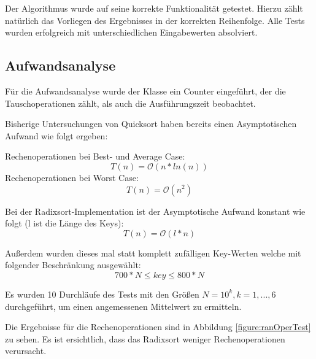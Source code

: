 \documentclass[11pt]{scrartcl}
\begin{document}
		Der Algorithmus wurde auf seine korrekte Funktionalität getestet.
		Hierzu zählt natürlich das Vorliegen des Ergebnisses in der korrekten Reihenfolge.
		Alle Tests wurden erfolgreich mit unterschiedlichen Eingabewerten absolviert.
	
	\subsection{Aufwandsanalyse}
		\label{sec:aufwand}
		
		Für die Aufwandsanalyse wurde der Klasse ein Counter eingeführt, der die Tauschoperationen zählt, als auch die Ausführungszeit beobachtet. 
		
		Bisherige Untersuchungen von Quicksort haben bereits einen Asymptotischen Aufwand wie folgt ergeben:

		Rechenoperationen bei Best- und Average Case:
		\begin{equation*}
		T(n) = \mathcal{O}(n*ln(n))
		\end{equation*}
		Rechenoperationen bei Worst Case:
		\begin{equation*}
		T(n) = \mathcal{O}(n^{2})
		\end{equation*}

		Bei der Radixsort-Implementation ist der Asymptotische Aufwand konstant wie folgt (l ist die Länge des Keys):
		\begin{equation*}
		T(n) = \mathcal{O}(l*n)
		\end{equation*}
        
		Außerdem wurden dieses mal statt komplett zufälligen Key-Werten welche mit folgender Beschränkung ausgewählt: 
		\begin{equation*}
		700*N \leq key \leq 800*N
		\end{equation*}
        
		Es wurden 10 Durchläufe des Tests mit den Größen $N=10^k, k=1,...,6$ durchgeführt, um einen angemessenen Mittelwert zu ermitteln.

		Die Ergebnisse für die Rechenoperationen sind in Abbildung \ref{figure:ranOperTest} zu sehen.
		Es ist ersichtlich, dass das Radixsort weniger Rechenoperationen verursacht.
\end{document}
